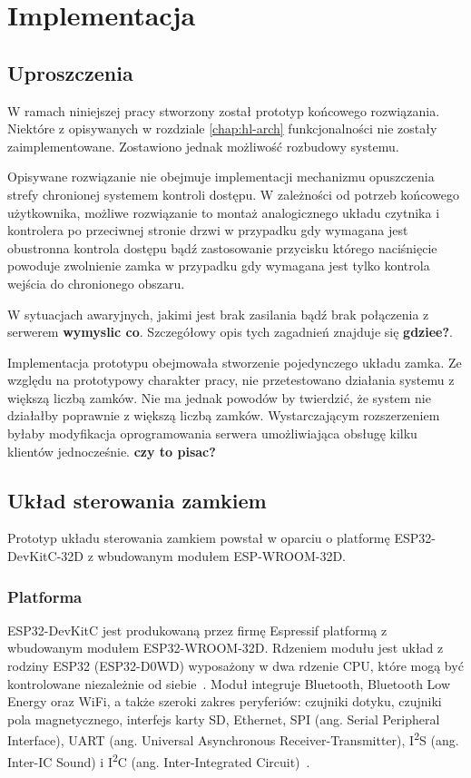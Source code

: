 \chapter{Implementacja}

\section{Uproszczenia}

W ramach niniejszej pracy stworzony został prototyp końcowego rozwiązania. Niektóre z opisywanych w rozdziale \ref{chap:hl-arch} funkcjonalności nie zostały zaimplementowane. Zostawiono jednak możliwość rozbudowy systemu.

Opisywane rozwiązanie nie obejmuje implementacji mechanizmu opuszczenia strefy chronionej systemem kontroli dostępu. W zależności od potrzeb końcowego użytkownika, możliwe rozwiązanie to montaż analogicznego układu czytnika i kontrolera po przeciwnej stronie drzwi w przypadku gdy wymagana jest obustronna kontrola dostępu bądź zastosowanie przycisku którego naciśnięcie powoduje zwolnienie zamka w przypadku gdy wymagana jest tylko kontrola wejścia do chronionego obszaru.

W sytuacjach awaryjnych, jakimi jest brak zasilania bądź brak połączenia z serwerem \textbf{wymyslic co}. Szczegółowy opis tych zagadnień znajduje się \textbf{gdziee?}.

Implementacja prototypu obejmowała stworzenie pojedynczego układu zamka. Ze względu na prototypowy charakter pracy, nie przetestowano działania systemu z większą liczbą zamków. Nie ma jednak powodów by twierdzić, że system nie działałby poprawnie z większą liczbą zamków. Wystarczającym rozszerzeniem byłaby modyfikacja oprogramowania serwera umożliwiająca obsługę kilku klientów jednocześnie. \textbf{czy to pisac?}

\section{Układ sterowania zamkiem}

Prototyp układu sterowania zamkiem powstał w oparciu o platformę ESP32-DevKitC-32D z wbudowanym modułem ESP-WROOM-32D.

\subsection{Platforma}

ESP32-DevKitC jest produkowaną przez firmę Espressif platformą z wbudowanym modułem ESP32-WROOM-32D. Rdzeniem modułu jest układ z rodziny ESP32 (ESP32-D0WD) wyposażony w dwa rdzenie CPU, które mogą być kontrolowane niezależnie od siebie~\cite{esp32-wroom32-ds}. Moduł integruje Bluetooth, Bluetooth Low Energy oraz WiFi, a także szeroki zakres peryferiów: czujniki dotyku, czujniki pola magnetycznego, interfejs karty SD, Ethernet, SPI (ang. Serial Peripheral Interface), UART (ang. Universal Asynchronous Receiver-Transmitter), I\textsuperscript{2}S (ang. Inter-IC Sound) i I\textsuperscript{2}C (ang. Inter-Integrated Circuit)~\cite{esp32-wroom32-ds}.

